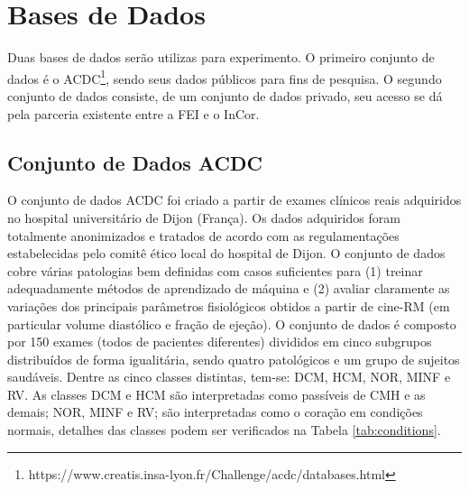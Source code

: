 \section{Bases de Dados} 
\label{subsec:cap4_dataset}

Duas bases de dados serão utilizas para experimento. O primeiro conjunto de dados é o \gls{ACDC}\footnote{https://www.creatis.insa-lyon.fr/Challenge/acdc/databases.html}, sendo seus dados públicos para fins de pesquisa. O segundo conjunto de dados consiste, de um conjunto de dados privado, seu acesso se dá pela parceria existente entre a \gls{FEI} e o \gls{InCor}.

\subsection{Conjunto de Dados ACDC} 
\label{subsec:cap4_acdc}

O conjunto de dados \gls{ACDC} foi criado a partir de exames clínicos reais adquiridos no hospital universitário de Dijon (França). Os dados adquiridos foram totalmente anonimizados e tratados de acordo com as regulamentações estabelecidas pelo comitê ético local do hospital de Dijon. O conjunto de dados cobre várias patologias bem definidas com casos suficientes para (1) treinar adequadamente métodos de aprendizado de máquina e (2) avaliar claramente as variações dos principais parâmetros fisiológicos obtidos a partir de cine-RM (em particular volume diastólico e fração de ejeção). O conjunto de dados é composto por 150 exames (todos de pacientes diferentes) divididos em cinco subgrupos distribuídos de forma igualitária, sendo quatro patológicos e um grupo de sujeitos saudáveis. Dentre as cinco classes distintas, tem-se: \gls{DCM}, \gls{HCM}, \gls{NOR}, \gls{MINF} e \gls{RV}. As classes \gls{DCM} e \gls{HCM} são interpretadas como passíveis de \gls{CMH} e as demais; \gls{NOR}, \gls{MINF} e \gls{RV}; são interpretadas como o coração em condições normais, detalhes das classes podem ser verificados na Tabela \ref{tab:conditions}. 

